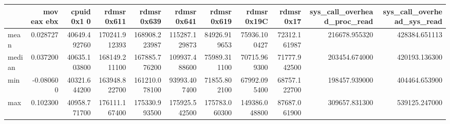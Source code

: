 \begin{tabular}{lrrrrrrrrrr}
\toprule
 & mov eax ebx & cpuid 0x1 0 & rdmsr 0x611 & rdmsr 0x639 & rdmsr 0x641 & rdmsr 0x619 & rdmsr 0x19C & rdmsr 0x17 & sys_call_overhead_proc_read & sys_call_overhead_sys_read \\
\midrule
mean & 0.028727 & 40649.492760 & 170241.912393 & 168908.223987 & 115287.129873 & 84926.919653 & 75936.100427 & 72312.161987 & 216678.955320 & 428384.651113 \\
median & 0.037200 & 40635.103800 & 168149.211100 & 167885.776200 & 109937.488600 & 75989.311100 & 70715.969300 & 71777.942500 & 203454.674000 & 420193.136300 \\
min & -0.080600 & 40321.644200 & 163948.822700 & 161210.078100 & 93993.407400 & 71855.802100 & 67992.095400 & 68757.122700 & 198457.939000 & 404464.653900 \\
max & 0.102300 & 40958.771700 & 176111.167400 & 175330.993500 & 175925.542500 & 175783.060300 & 149386.048800 & 87687.061900 & 309657.831300 & 539125.247000 \\
\bottomrule
\end{tabular}
